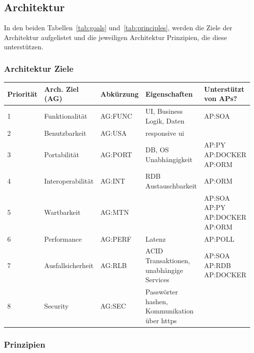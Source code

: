 \subsection{Architektur}

In den beiden Tabellen~\ref{tab:goals} und~\ref{tab:principles}, werden die Ziele der Architektur aufgelistet
und die jeweiligen Architektur Prinzipien, die diese unterstützen.

\subsubsection{Architektur Ziele}
\begin{center}
    \begin{tabular}{|l|l|l| p{5cm} |p{2.5cm}|}
        \hline
        \textbf{Priorität} & \textbf{Arch. Ziel (AG)} & \textbf{Abkürzung} & \textbf{Eigenschaften} & \textbf{Unterstützt von APs?} \\
        \hline
        1 & Funktionalität & AG:FUNC & UI, Business Logik, Daten & AP:SOA \\
        2 & Benutzbarkeit & AG:USA & responsive ui &  \\
        3 & Portabilität & AG:PORT & DB, OS Unabhängigkeit & AP:PY AP:DOCKER AP:ORM\\
        4 & Interoperabilität & AG:INT & RDB Austauschbarkeit & AP:ORM \\
        5 & Wartbarkeit & AG:MTN & & AP:SOA AP:PY AP:DOCKER AP:ORM\\
        6 & Performance & AG:PERF & Latenz & AP:POLL \\
        7 & Ausfallsicherheit & AG:RLB & ACID Transaktionen, unabhängige Services & AP:SOA AP:RDB AP:DOCKER\\
        8 & Security & AG:SEC & Passwörter hashen, Kommunikation über https &  \\
        \hline
    \end{tabular}
    \label{tab:goals}
\end{center}
\subsubsection{Prinzipien}

